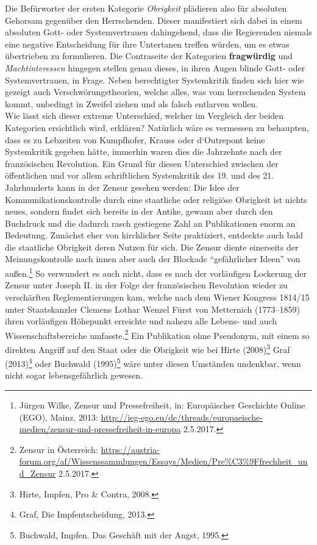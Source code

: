 \documentclass[
    a4paper,
    12pt,
    hyphens,
    chapterprefix=true,
    headheight=33pt,
    footheight=29pt,
    headings=optiontohead, %
]{scrartcl}
\begin{document}
{Die Befürworter der ersten Kategorie \textit{Obrigkeit} plädieren also für absoluten Gehorsam gegenüber den Herrschenden. Dieser manifestiert sich dabei in einem absoluten Gott- oder Systemvertrauen dahingehend, dass die Regierenden niemals eine negative Entscheidung für ihre Untertanen treffen würden, um es etwas übertrieben zu formulieren. Die Contraseite der Kategorien \textbf{fragwürdig} und \textit{Machtinteressen} hingegen stellen genau dieses, in ihren Augen blinde Gott- oder Systemvertrauen, in Frage. Neben berechtigter Systemkritik finden sich hier wie gezeigt auch Verschwörungstheorien, welche alles, was vom herrschenden System kommt, unbedingt in Zweifel ziehen und als falsch entlarven wollen.\\
Wie lässt sich dieser extreme Unterschied, welcher im Vergleich der beiden Kategorien ersichtlich wird, erklären? Natürlich wäre es vermessen zu behaupten, dass es zu Lebzeiten von Kumpfhofer, Krauss oder d`Outrepont keine Systemkritik gegeben hätte, immerhin waren dies die Jahrzehnte nach der französischen Revolution. Ein Grund für diesen Unterschied zwischen der öffentlichen und vor allem schriftlichen Systemkritik des 19. und des 21. Jahrhunderts kann in der Zensur gesehen werden: Die Idee der Kommunikationskontrolle durch eine staatliche oder religiöse Obrigkeit ist nichts neues, sondern findet sich bereits in der Antike, gewann aber durch den Buchdruck und die dadurch rasch gestiegene Zahl an Publikationen enorm an Bedeutung. Zunächst eher von kirchlicher Seite praktiziert, entdeckte auch bald die staatliche Obrigkeit deren Nutzen für sich. Die Zensur diente einerseits der Meinungskontrolle nach innen aber auch der Blockade "`gefährlicher Ideen"' von außen.\footnote{Jürgen Wilke, Zensur und Pressefreiheit, in: Europäischer Geschichte Online (EGO), Mainz, 2013: \url{http://ieg-ego.eu/de/threads/europaeische-medien/zensur-und-pressefreiheit-in-europa} 2.5.2017. } So verwundert es auch nicht, dass es nach der vorläufigen Lockerung der Zensur unter Joseph II. in der Folge der französischen Revolution wieder zu verschärften Reglementierungen kam, welche nach dem Wiener Kongress 1814/15 unter Staatskanzler Clemens Lothar Wenzel Fürst von Metternich (1773--1859) ihren vorläufigen Höhepunkt erreichte und nahezu alle Lebens- und auch Wissenschaftsbereiche umfasste.\footnote{Zensur in Österreich: \url{https://austria-forum.org/af/Wissenssammlungen/Essays/Medien/Pre\%C3\%9Ffrechheit_und_Zensur} 2.5.2017.} Ein Publikation ohne Pseudonym, mit einem so direkten Angriff auf den Staat oder die Obrigkeit wie bei Hirte (2008)\footnote{Hirte, Impfen, Pro \& Contra, 2008.} Graf (2013)\footnote{Graf, Die Impfentscheidung, 2013.} oder Buchwald (1995)\footnote{Buchwald, Impfen. Das Geschäft mit der Angst, 1995.} wäre unter diesen Umständen undenkbar, wenn nicht sogar lebensgefährlich gewesen.\\
}
\end{document}
